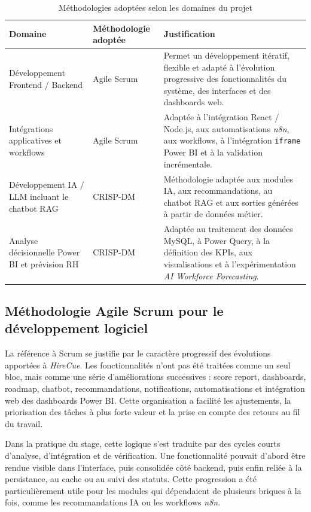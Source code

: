 \begin{table}[H]
\centering
\renewcommand{\arraystretch}{1.3}
\begin{tabular}{|p{4cm}|p{4cm}|p{6cm}|}
\hline
\rowcolor{TableHeaderBlue}
\textbf{Domaine} & \textbf{Méthodologie adoptée} & \textbf{Justification} \\
\hline
Développement Frontend / Backend & Agile Scrum & Permet un développement itératif, flexible et adapté à l'évolution progressive des fonctionnalités du système, des interfaces et des dashboards web. \\
\hline
Intégrations applicatives et workflows & Agile Scrum & Adaptée à l'intégration React / Node.js, aux automatisations \textit{n8n}, aux workflows, à l'intégration \texttt{iframe} Power BI et à la validation incrémentale. \\
\hline
Développement IA / LLM incluant le chatbot RAG & CRISP-DM & Méthodologie adaptée aux modules IA, aux recommandations, au chatbot RAG et aux sorties générées à partir de données métier. \\
\hline
Analyse décisionnelle Power BI et prévision RH & CRISP-DM & Adaptée au traitement des données MySQL, à Power Query, à la définition des KPIs, aux visualisations et à l'expérimentation \textit{AI Workforce Forecasting}. \\
\hline
\end{tabular}
\caption{Méthodologies adoptées selon les domaines du projet}
\end{table}

\subsection{Méthodologie Agile Scrum pour le développement logiciel}

La référence à Scrum se justifie par le caractère progressif des évolutions apportées à \textit{HireCue}. Les fonctionnalités n'ont pas été traitées comme un seul bloc, mais comme une série d'améliorations successives : score report, dashboards, roadmap, chatbot, recommandations, notifications, automatisations et intégration web des dashboards Power BI. Cette organisation a facilité les ajustements, la priorisation des tâches à plus forte valeur et la prise en compte des retours au fil du travail.

Dans la pratique du stage, cette logique s'est traduite par des cycles courts d'analyse, d'intégration et de vérification. Une fonctionnalité pouvait d'abord être rendue visible dans l'interface, puis consolidée côté backend, puis enfin reliée à la persistance, au cache ou au suivi des statuts. Cette progression a été particulièrement utile pour les modules qui dépendaient de plusieurs briques à la fois, comme les recommandations IA ou les workflows \textit{n8n}.

